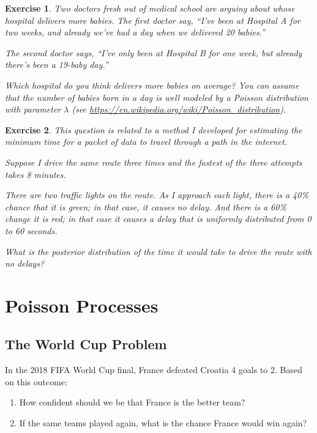 \documentclass[12pt]{book}
\theoremstyle{exercise}
\newtheorem{exercise}{Exercise}[chapter]
\begin{document}
\begin{exercise} 
Two doctors fresh out of medical school are arguing about whose hospital delivers more babies.  The first doctor say, ``I've been at Hospital A for two weeks, and already we've had a day when we delivered 20 babies.''

The second doctor says, ``I've only been at Hospital B for one week, but already there's been a 19-baby day.''

Which hospital do you think delivers more babies on average?  You can assume that the number of babies born in a day is well modeled by a Poisson distribution with parameter $\lambda$ (see \url{https://en.wikipedia.org/wiki/Poisson_distribution}).

\end{exercise}


\begin{exercise}
This question is related to a method I developed for estimating the minimum time for a packet of data to travel through a path in the internet.

Suppose I drive the same route three times and the fastest of the three attempts takes 8 minutes.

There are two traffic lights on the route. As I approach each light, there is a 40\% chance that it is green; in that case, it causes no delay. And there is a 60\% change it is red; in that case it causes a delay that is uniformly distributed from 0 to 60 seconds.

What is the posterior distribution of the time it would take to drive the route with no delays?
\end{exercise}



\chapter{Poisson Processes}
\label{prediction}

\newcommand{\lam}{\mathtt{\lambda}}

\section{The World Cup Problem}

In the 2018 FIFA World Cup final, France defeated Croatia 4 goals to 2.  Based on this outcome:

\begin{enumerate}

\item How confident should we be that France is the better team?

\item If the same teams played again, what is the chance France would win again?

\end{enumerate}
\end{document}
